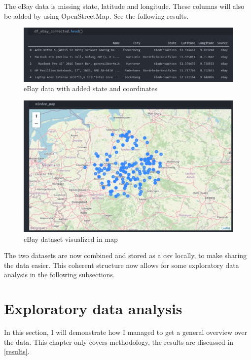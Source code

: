 The eBay data is missing state, latitude and longitude. These columns will also be added by using OpenStreetMap. See the following results.

\begin{figure}[H]
	\includegraphics[width=\textwidth]{Bilder/eBay_preprocessed.PNG}
	\caption{eBay data with added state and coordinates}
\end{figure}
\begin{figure}[H]
	\includegraphics[width=\textwidth]{Bilder/eBay_Map.PNG}
	\caption{eBay dataset visualized in map}
\end{figure}

The two datasets are now combined and stored as a csv locally, to make sharing the data easier. This coherent structure now allows for some exploratory data analysis in the following subsections.
\section{Exploratory data analysis}
In this section, I will demonstrate how I managed to get a general overview over the data. This chapter only covers methodology, the results are discussed in \ref{results}.
